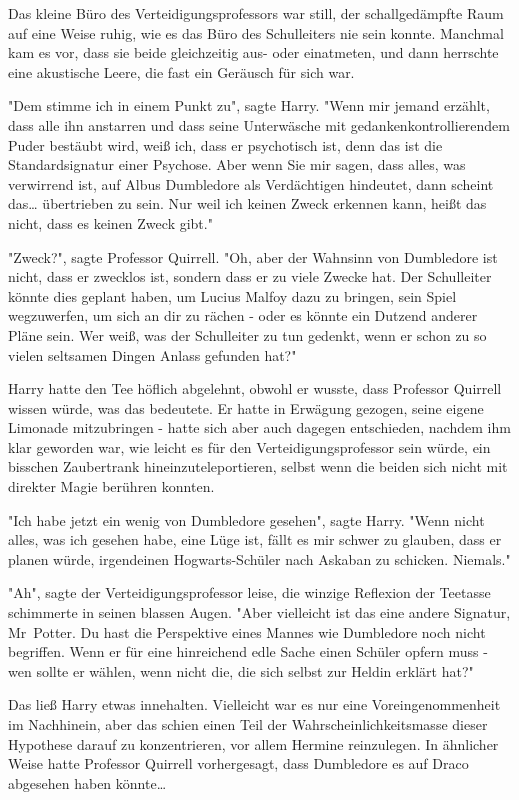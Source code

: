 {Das kleine Büro des Verteidigungsprofessors war still, der schallgedämpfte Raum auf eine Weise ruhig, wie es das Büro des Schulleiters nie sein konnte. Manchmal kam es vor, dass sie beide gleichzeitig aus- oder einatmeten, und dann herrschte eine akustische Leere, die fast ein Geräusch für sich war.

"Dem stimme ich in einem Punkt zu", sagte Harry. "Wenn mir jemand erzählt, dass alle ihn anstarren und dass seine Unterwäsche mit gedankenkontrollierendem Puder bestäubt wird, weiß ich, dass er psychotisch ist, denn das ist die Standardsignatur einer Psychose. Aber wenn Sie mir sagen, dass alles, was verwirrend ist, auf Albus Dumbledore als Verdächtigen hindeutet, dann scheint das… übertrieben zu sein. Nur weil ich keinen Zweck erkennen kann, heißt das nicht, dass es keinen Zweck gibt."

"Zweck?", sagte Professor Quirrell. "Oh, aber der Wahnsinn von Dumbledore ist nicht, dass er zwecklos ist, sondern dass er zu viele Zwecke hat. Der Schulleiter könnte dies geplant haben, um Lucius Malfoy dazu zu bringen, sein Spiel wegzuwerfen, um sich an dir zu rächen - oder es könnte ein Dutzend anderer Pläne sein. Wer weiß, was der Schulleiter zu tun gedenkt, wenn er schon zu so vielen seltsamen Dingen Anlass gefunden hat?"

Harry hatte den Tee höflich abgelehnt, obwohl er wusste, dass Professor Quirrell wissen würde, was das bedeutete. Er hatte in Erwägung gezogen, seine eigene Limonade mitzubringen - hatte sich aber auch dagegen entschieden, nachdem ihm klar geworden war, wie leicht es für den Verteidigungsprofessor sein würde, ein bisschen Zaubertrank hineinzuteleportieren, selbst wenn die beiden sich nicht mit direkter Magie berühren konnten.

"Ich habe jetzt ein wenig von Dumbledore gesehen", sagte Harry. "Wenn nicht alles, was ich gesehen habe, eine Lüge ist, fällt es mir schwer zu glauben, dass er planen würde, irgendeinen Hogwarts-Schüler nach Askaban zu schicken. Niemals."

"Ah", sagte der Verteidigungsprofessor leise, die winzige Reflexion der Teetasse schimmerte in seinen blassen Augen. "Aber vielleicht ist das eine andere Signatur, Mr~Potter. Du hast die Perspektive eines Mannes wie Dumbledore noch nicht begriffen. Wenn er für eine hinreichend edle Sache einen Schüler opfern muss - wen sollte er wählen, wenn nicht die, die sich selbst zur Heldin erklärt hat?"

Das ließ Harry etwas innehalten. Vielleicht war es nur eine Voreingenommenheit im Nachhinein, aber das schien einen Teil der Wahrscheinlichkeitsmasse dieser Hypothese darauf zu konzentrieren, vor allem Hermine reinzulegen. In ähnlicher Weise hatte Professor Quirrell vorhergesagt, dass Dumbledore es auf Draco abgesehen haben könnte…

}
